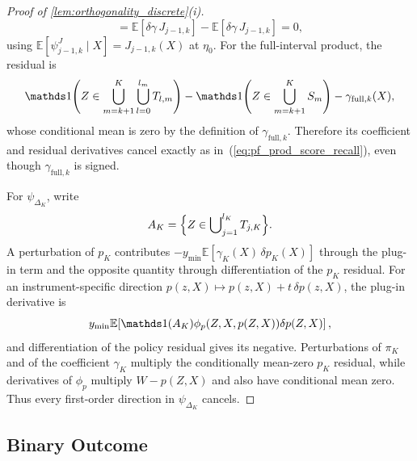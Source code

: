 \begin{proof}[Proof of \cref{lem:orthogonality_discrete}\textup{(i)}]
\[    = \mathbb{E}[\delta\gamma\,J_{j-1,k}] - \mathbb{E}[\delta\gamma\,J_{j-1,k}] = 0,
\]
using $\mathbb{E}[\psi_{j-1,k}^J \mid X] = J_{j-1,k}(X)$ at $\eta_0$. For the full-interval product, the residual is
\[
\indicator\!\left(Z\in\bigcup_{m=k+1}^K\bigcup_{l=0}^{l_m}T_{l,m}\right)
-\indicator\!\left(Z\in\bigcup_{m=k+1}^KS_m\right)-\gamma_{\mathrm{full},k}(X),
\]
whose conditional mean is zero by the definition of $\gamma_{\mathrm{full},k}$. Therefore its coefficient and residual derivatives cancel exactly as in~(\ref{eq:pf_prod_score_recall}), even though $\gamma_{\mathrm{full},k}$ is signed.

For $\psi_{\Delta_K}$, write
\begin{equation*}
    A_K=\Bigl\{Z\in\bigcup\nolimits_{j=1}^{l_K}T_{j,K}\Bigr\}.
\end{equation*}
A perturbation of $p_K$ contributes $-y_{\min}\mathbb E[\gamma_K(X)\,\delta p_K(X)]$ through the plug-in term and the opposite quantity through differentiation of the $p_K$ residual. For an instrument-specific direction $p(z,X)\mapsto p(z,X)+t\,\delta p(z,X)$, the plug-in derivative is
\[
y_{\min}\mathbb E\!\left[\indicator(A_K)\phi_p(Z,X,p(Z,X))\delta p(Z,X)\right],
\]
and differentiation of the policy residual gives its negative. Perturbations of $\pi_K$ and of the coefficient $\gamma_K$ multiply the conditionally mean-zero $p_K$ residual, while derivatives of $\phi_p$ multiply $W-p(Z,X)$ and also have conditional mean zero. Thus every first-order direction in $\psi_{\Delta_K}$ cancels.

\end{proof}

\subsection{Binary Outcome}\label{oa:orthogonality_binary}

